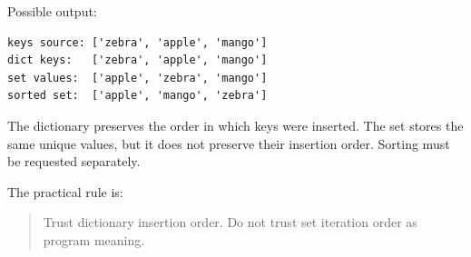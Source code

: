 Possible output:

\begin{verbatim}
keys source: ['zebra', 'apple', 'mango']
dict keys:   ['zebra', 'apple', 'mango']
set values:  ['apple', 'zebra', 'mango']
sorted set:  ['apple', 'mango', 'zebra']
\end{verbatim}

The dictionary preserves the order in which keys were inserted. The set stores the same unique values, but it does not preserve their insertion order. Sorting must be requested separately.

The practical rule is:

\begin{quote}
Trust dictionary insertion order. Do not trust set iteration order as program meaning.
\end{quote}